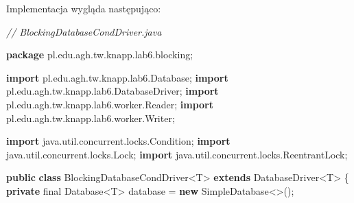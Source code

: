 \documentclass[11pt]{article}
\newenvironment{Shaded}{}{}
\newcommand{\KeywordTok}[1]{\textcolor[rgb]{0.00,0.44,0.13}{\textbf{{#1}}}}
\newcommand{\DataTypeTok}[1]{\textcolor[rgb]{0.56,0.13,0.00}{{#1}}}
\newcommand{\CommentTok}[1]{\textcolor[rgb]{0.38,0.63,0.69}{\textit{{#1}}}}
\newcommand{\NormalTok}[1]{{#1}}
\newcommand{\ImportTok}[1]{{#1}}
\newcommand{\OperatorTok}[1]{\textcolor[rgb]{0.40,0.40,0.40}{{#1}}}
\begin{document}
Implementacja wygląda następująco:

\begin{Shaded}
\begin{Highlighting}[]
\CommentTok{// BlockingDatabaseCondDriver.java}

\KeywordTok{package}\ImportTok{ pl}\OperatorTok{.}\ImportTok{edu}\OperatorTok{.}\ImportTok{agh}\OperatorTok{.}\ImportTok{tw}\OperatorTok{.}\ImportTok{knapp}\OperatorTok{.}\ImportTok{lab6}\OperatorTok{.}\ImportTok{blocking}\OperatorTok{;}

\KeywordTok{import} \ImportTok{pl}\OperatorTok{.}\ImportTok{edu}\OperatorTok{.}\ImportTok{agh}\OperatorTok{.}\ImportTok{tw}\OperatorTok{.}\ImportTok{knapp}\OperatorTok{.}\ImportTok{lab6}\OperatorTok{.}\ImportTok{Database}\OperatorTok{;}
\KeywordTok{import} \ImportTok{pl}\OperatorTok{.}\ImportTok{edu}\OperatorTok{.}\ImportTok{agh}\OperatorTok{.}\ImportTok{tw}\OperatorTok{.}\ImportTok{knapp}\OperatorTok{.}\ImportTok{lab6}\OperatorTok{.}\ImportTok{DatabaseDriver}\OperatorTok{;}
\KeywordTok{import} \ImportTok{pl}\OperatorTok{.}\ImportTok{edu}\OperatorTok{.}\ImportTok{agh}\OperatorTok{.}\ImportTok{tw}\OperatorTok{.}\ImportTok{knapp}\OperatorTok{.}\ImportTok{lab6}\OperatorTok{.}\ImportTok{worker}\OperatorTok{.}\ImportTok{Reader}\OperatorTok{;}
\KeywordTok{import} \ImportTok{pl}\OperatorTok{.}\ImportTok{edu}\OperatorTok{.}\ImportTok{agh}\OperatorTok{.}\ImportTok{tw}\OperatorTok{.}\ImportTok{knapp}\OperatorTok{.}\ImportTok{lab6}\OperatorTok{.}\ImportTok{worker}\OperatorTok{.}\ImportTok{Writer}\OperatorTok{;}

\KeywordTok{import} \ImportTok{java}\OperatorTok{.}\ImportTok{util}\OperatorTok{.}\ImportTok{concurrent}\OperatorTok{.}\ImportTok{locks}\OperatorTok{.}\ImportTok{Condition}\OperatorTok{;}
\KeywordTok{import} \ImportTok{java}\OperatorTok{.}\ImportTok{util}\OperatorTok{.}\ImportTok{concurrent}\OperatorTok{.}\ImportTok{locks}\OperatorTok{.}\ImportTok{Lock}\OperatorTok{;}
\KeywordTok{import} \ImportTok{java}\OperatorTok{.}\ImportTok{util}\OperatorTok{.}\ImportTok{concurrent}\OperatorTok{.}\ImportTok{locks}\OperatorTok{.}\ImportTok{ReentrantLock}\OperatorTok{;}

\KeywordTok{public} \KeywordTok{class}\NormalTok{ BlockingDatabaseCondDriver}\OperatorTok{\textless{}}\NormalTok{T}\OperatorTok{\textgreater{}} \KeywordTok{extends}\NormalTok{ DatabaseDriver}\OperatorTok{\textless{}}\NormalTok{T}\OperatorTok{\textgreater{}} \OperatorTok{\{}
    \KeywordTok{private} \DataTypeTok{final}\NormalTok{ Database}\OperatorTok{\textless{}}\NormalTok{T}\OperatorTok{\textgreater{}}\NormalTok{ database }\OperatorTok{=} \KeywordTok{new}\NormalTok{ SimpleDatabase}\OperatorTok{\textless{}\textgreater{}();}


\end{Highlighting}
\end{Shaded}
\end{document}
